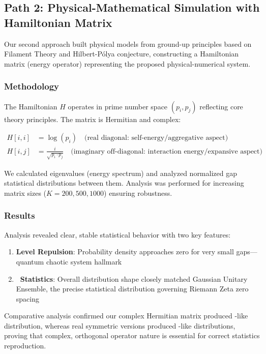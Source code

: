 \documentclass[11pt,a4paper]{article}
\newcommand{\GUE}{\text{GUE}}
\newcommand{\GOE}{\text{GOE}}
\begin{document}
\subsection{Path 2: Physical-Mathematical Simulation with Hamiltonian Matrix}

Our second approach built physical models from ground-up principles based on Filament Theory and Hilbert-Pólya conjecture, constructing a Hamiltonian matrix (energy operator) representing the proposed physical-numerical system.

\subsubsection{Methodology}

The Hamiltonian $H$ operates in prime number space $(p_i, p_j)$ reflecting core theory principles. The matrix is Hermitian and complex:

\begin{align}
H[i,i] &= \log(p_i) \quad \text{(real diagonal: self-energy/aggregative aspect)}\\
H[i,j] &= \frac{i}{\sqrt{p_i \cdot p_j}} \quad \text{(imaginary off-diagonal: interaction energy/expansive aspect)}
\end{align}

We calculated eigenvalues (energy spectrum) and analyzed normalized gap statistical distributions between them. Analysis was performed for increasing matrix sizes ($K = 200, 500, 1000$) ensuring robustness.

\subsubsection{Results}

Analysis revealed clear, stable statistical behavior with two key features:

\begin{enumerate}
\item \textbf{Level Repulsion}: Probability density approaches zero for very small gaps—quantum chaotic system hallmark
\item \textbf{\GUE\ Statistics}: Overall distribution shape closely matched Gaussian Unitary Ensemble, the precise statistical distribution governing Riemann Zeta zero spacing
\end{enumerate}

Comparative analysis confirmed our complex Hermitian matrix produced \GUE-like distribution, whereas real symmetric versions produced \GOE-like distributions, proving that complex, orthogonal operator nature is essential for correct statistics reproduction.
\end{document}
